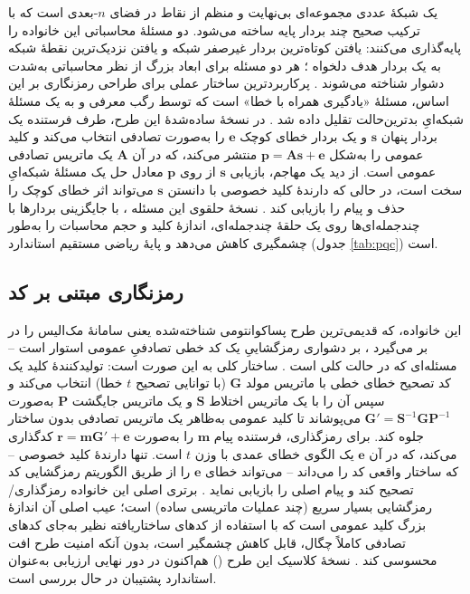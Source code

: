 یک شبکهٔ عددی  مجموعه‌ای بی‌نهایت و منظم از نقاط در فضای $n$-بعدی است که با ترکیب صحیح چند بردار پایه ساخته می‌شود. دو مسئلهٔ محاسباتی این خانواده را پایه‌گذاری می‌کنند: یافتن کوتاه‌ترین بردار غیرصفر شبکه  و یافتن نزدیک‌ترین نقطهٔ شبکه به یک بردار هدف دلخواه ؛ هر دو مسئله برای ابعاد بزرگ از نظر محاسباتی به‌شدت دشوار شناخته می‌شوند \Cite{djordjevic2025pqc}. پرکاربردترین ساختار عملی برای طراحی رمزنگاری بر این اساس، مسئلهٔ «یادگیری همراه با خطا»  است که توسط رگب معرفی و به یک مسئلهٔ شبکه‌ایِ بدترین‌حالت تقلیل داده شد \Cite{regev2009lwe}. در نسخهٔ ساده‌شدهٔ این طرح، طرف فرستنده یک بردار پنهان $\mathbf{s}$ و یک بردار خطای کوچک $\mathbf{e}$ را به‌صورت تصادفی انتخاب می‌کند و کلید عمومی را به‌شکل $\mathbf{p} = \mathbf{A}\mathbf{s} + \mathbf{e}$ منتشر می‌کند، که در آن $\mathbf{A}$ یک ماتریس تصادفی عمومی است. از دید یک مهاجم، بازیابی $\mathbf{s}$ از روی $\mathbf{p}$ معادل حل یک مسئلهٔ شبکه‌ایِ سخت است، در حالی که دارندهٔ کلید خصوصی با دانستن $\mathbf{s}$ می‌تواند اثر خطای کوچک را حذف و پیام را بازیابی کند \Cite{djordjevic2025pqc}. نسخهٔ حلقوی این مسئله ، با جایگزینی بردارها با چندجمله‌ای‌ها روی یک حلقهٔ چندجمله‌ای، اندازهٔ کلید و حجم محاسبات را به‌طور چشمگیری کاهش می‌دهد و پایهٔ ریاضی مستقیم استاندارد  (جدول \ref{tab:pqc}) است.

\subsection{رمزنگاری مبتنی بر کد }

این خانواده، که قدیمی‌ترین طرح پساکوانتومی شناخته‌شده یعنی سامانهٔ مک‌الیس  را در بر می‌گیرد \Cite{mceliece1978}، بر دشواری رمزگشاییِ یک کد خطی تصادفیِ عمومی استوار است -- مسئله‌ای که در حالت کلی  است \Cite{sendrier2017codebased}. ساختار کلی به این صورت است: تولیدکنندهٔ کلید یک کد تصحیح خطای خطی با ماتریس مولد $\mathbf{G}$ (با توانایی تصحیح $t$ خطا) انتخاب می‌کند و سپس آن را با یک ماتریس اختلاط $\mathbf{S}$ و یک ماتریس جایگشت $\mathbf{P}$ به‌صورت $\mathbf{G}' = \mathbf{S}^{-1}\mathbf{G}\mathbf{P}^{-1}$ می‌پوشاند تا کلید عمومی به‌ظاهر یک ماتریس تصادفی بدون ساختار جلوه کند. برای رمزگذاری، فرستنده پیام $\mathbf{m}$ را به‌صورت $\mathbf{r} = \mathbf{m}\mathbf{G}' + \mathbf{e}$ کدگذاری می‌کند، که در آن $\mathbf{e}$ یک الگوی خطای عمدی با وزن $t$ است. تنها دارندهٔ کلید خصوصی -- که ساختار واقعی کد را می‌داند -- می‌تواند خطای $\mathbf{e}$ را از طریق الگوریتم رمزگشایی کد تصحیح کند و پیام اصلی را بازیابی نماید \Cite{djordjevic2025pqc}. برتری اصلی این خانواده رمزگذاری/رمزگشایی بسیار سریع (چند عملیات ماتریسی ساده) است؛ عیب اصلی آن اندازهٔ بزرگ کلید عمومی است که با استفاده از کدهای ساختاریافته نظیر  به‌جای کدهای تصادفی کاملاً چگال، قابل کاهش چشمگیر است، بدون آنکه امنیت طرح افت محسوسی کند \Cite{sendrier2017codebased}. نسخهٔ کلاسیک این طرح () هم‌اکنون در دور نهایی ارزیابی  به‌عنوان استاندارد پشتیبان  در حال بررسی است.

